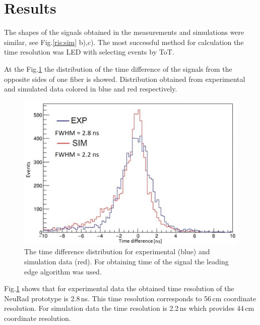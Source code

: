 \documentclass{webofc}
\begin{document}
\section{Results}

The shapes of the signals obtained in the measurements and simulations were similar, see Fig.\ref{ris:sim} b),c). 
The most successful method for calculation the time resolution was LED with selecting events by ToT.

At the Fig.\ref{ris:tausim} the distribution of the time difference of the signals from the opposite sides of one fiber is showed. Distribution obtained from experimental and simulated data colored in blue and red respectively.

\begin{figure}[h]
	\centering
	\includegraphics[width=0.8\linewidth]{tausim.png}
	\caption{The time difference distribution for experimental (blue) and simulation data (red). For obtaining time of the signal the leading edge algorithm was used.}\label{ris:tausim}
\end{figure}

Fig.\ref{ris:tausim} shows that for experimental data the obtained time resolution of the NeuRad prototype is 2.8\,ns. This time resolution corresponds to 56\,cm coordinate resolution. For simulation data the time resolution is 2.2\,ns which provides 44\,cm coordinate resolution.  


\end{document}
